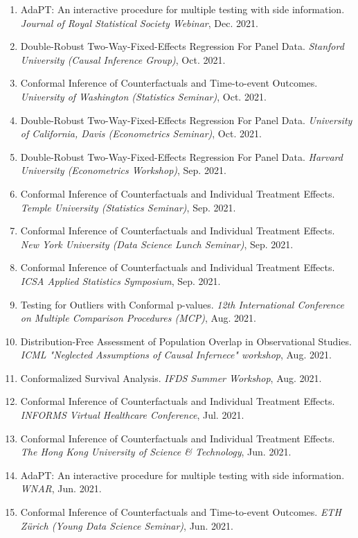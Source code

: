 \documentclass{article}
\begin{document}
\begin{enumerate}
\item AdaPT: An interactive procedure for multiple testing with side information. \emph{Journal of Royal Statistical Society Webinar}, Dec. 2021.
\item Double-Robust Two-Way-Fixed-Effects Regression For Panel Data. \emph{Stanford University (Causal Inference Group)}, Oct. 2021.
\item Conformal Inference of Counterfactuals and Time-to-event Outcomes. \emph{University of Washington (Statistics Seminar)}, Oct. 2021.
\item Double-Robust Two-Way-Fixed-Effects Regression For Panel Data. \emph{University of California, Davis (Econometrics Seminar)}, Oct. 2021.
\item Double-Robust Two-Way-Fixed-Effects Regression For Panel Data. \emph{Harvard University (Econometrics Workshop)}, Sep. 2021.
\item Conformal Inference of Counterfactuals and Individual Treatment Effects. \emph{Temple University (Statistics Seminar)}, Sep. 2021.
\item Conformal Inference of Counterfactuals and Individual Treatment Effects. \emph{New York University (Data Science Lunch Seminar)}, Sep. 2021.
\item Conformal Inference of Counterfactuals and Individual Treatment Effects. \emph{ICSA Applied Statistics Symposium}, Sep. 2021.
\item Testing for Outliers with Conformal p-values. \emph{12th International Conference on Multiple Comparison Procedures (MCP)}, Aug. 2021.
\item Distribution-Free Assessment of Population Overlap in Observational Studies. \emph{ICML "Neglected Assumptions of Causal Infernece" workshop}, Aug. 2021.
\item Conformalized Survival Analysis. \emph{IFDS Summer Workshop}, Aug. 2021.
\item Conformal Inference of Counterfactuals and Individual Treatment Effects. \emph{INFORMS Virtual Healthcare Conference}, Jul. 2021.
\item Conformal Inference of Counterfactuals and Individual Treatment Effects. \emph{The Hong Kong University of Science \& Technology}, Jun. 2021.
\item AdaPT: An interactive procedure for multiple testing with side information. \emph{WNAR}, Jun. 2021.
\item Conformal Inference of Counterfactuals and Time-to-event Outcomes. \emph{ETH Z\"{u}rich (Young Data Science Seminar)}, Jun. 2021.

\end{enumerate}
\end{document}
